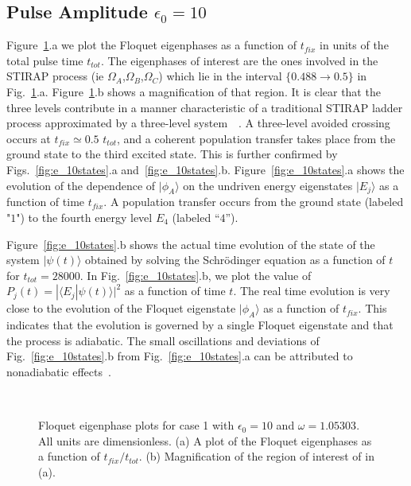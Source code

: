 %
%
\subsection{Pulse Amplitude $\epsilon_0 = 10$}
%
%

Figure~\ref{fig:e_10phase}.a we plot the Floquet eigenphases as a function of $t_{fix}$  in units of the total pulse time $t_{tot}$. The eigenphases of interest are the ones involved in the STIRAP process (ie $\Omega_A$,$\Omega_B$,$\Omega_C$) which lie in the interval $\lbrace 0.488{\rightarrow} 0.5\rbrace$ in Fig.~\ref{fig:e_10phase}.a.  Figure~\ref{fig:e_10phase}.b shows a magnification of that region. It is clear that the three levels contribute in a manner characteristic of a  traditional STIRAP ladder process  approximated by a three-level system~\cite{stirap:theory}~\cite{stirap:review}.  A three-level avoided crossing occurs at $t_{fix}\simeq 0.5$ $t_{tot}$, and  a coherent population transfer takes place from the ground state to the third excited state. This is further confirmed by Figs.~\ref{fig:e_10states}.a and~\ref{fig:e_10states}.b. Figure~\ref{fig:e_10states}.a  shows the evolution of  the dependence of $|\phi_A\rangle$ on the undriven energy eigenstates $|E_j{\rangle}$  as a function of time $t_{fix}$.  A population transfer occurs  from the ground state (labeled "$1$") to the fourth energy level $E_4$ (labeled ``$4$''). 

Figure~\ref{fig:e_10states}.b  shows the actual time evolution of the state of the system $|\psi(t){\rangle}$ obtained by solving the Schr\"odinger equation as a function of $t$ for $t_{tot} = 28000$. In Fig.~\ref{fig:e_10states}.b, we plot the value of $P_j(t)=|{\langle}E_j|\psi(t){\rangle}|^2$ as a function of time $t$. The real time evolution is very close to the evolution of the Floquet eigenstate $|\phi_A{\rangle}$ as a function of $t_{fix}$. This indicates that the evolution is governed by a single Floquet eigenstate and that the process is adiabatic. The small oscillations and deviations of Fig.~\ref{fig:e_10states}.b  from Fig.~\ref{fig:e_10states}.a  can be attributed to nonadiabatic effects~\cite{berry:base}.

\begin{figure}
\ 
\caption{Floquet eigenphase plots for case 1 with $\epsilon_0=10$ and  $\omega=1.05303$. All units are dimensionless.  (a) A  plot of the Floquet eigenphases as a function of $t_{fix}/t_{tot}$. (b) Magnification of the region of interest of in (a).}
\label{fig:e_10phase}
\end{figure}

